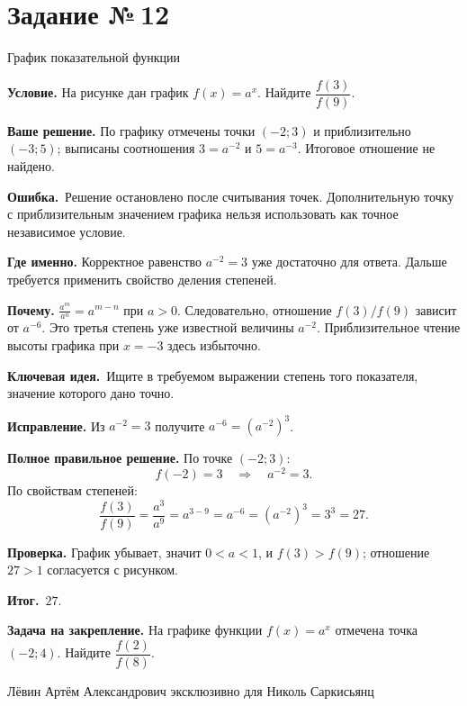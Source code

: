 \documentclass[a4paper,11pt]{article}
\newcommand{\Hdr}[1]{\par\vspace{2pt}\noindent\textbf{#1}\quad}
\newcommand{\E}{\par\smallskip\noindent\textcolor{errorred}{\textbf{Ошибка.}}\ }
\newcommand{\K}{\par\smallskip\noindent\textcolor{accent}{\textbf{Ключевая идея.}}\ }
\newcommand{\I}{\par\smallskip\noindent\textcolor{accent}{\textbf{Итог.}}\ }
\newcommand{\Task}[2]{\clearpage\phantomsection\label{task:#1}\section*{Задание №\,#1}\textcolor{accent}{#2}\par\vspace{7pt}}
\newcommand{\Footer}{\par\vfill\begin{center}\footnotesize\color{ink}Лёвин Артём Александрович эксклюзивно для Николь Саркисьянц\end{center}}
\begin{document}
\Task{12}{График показательной функции}
\Hdr{Условие.} На рисунке дан график $f(x)=a^x$. Найдите $\dfrac{f(3)}{f(9)}$.
\Hdr{Ваше решение.} По графику отмечены точки $(-2;3)$ и приблизительно $(-3;5)$; выписаны соотношения $3=a^{-2}$ и $5=a^{-3}$. Итоговое отношение не найдено.
\E Решение остановлено после считывания точек. Дополнительную точку с приблизительным значением графика нельзя использовать как точное независимое условие.
\Hdr{Где именно.} Корректное равенство $a^{-2}=3$ уже достаточно для ответа. Дальше требуется применить свойство деления степеней.
\Hdr{Почему.} $\frac{a^m}{a^n}=a^{m-n}$ при $a>0$. Следовательно, отношение $f(3)/f(9)$ зависит от $a^{-6}$. Это третья степень уже известной величины $a^{-2}$. Приблизительное чтение высоты графика при $x=-3$ здесь избыточно.
\K Ищите в требуемом выражении степень того показателя, значение которого дано точно.
\Hdr{Исправление.} Из $a^{-2}=3$ получите $a^{-6}=(a^{-2})^3$.
\Hdr{Полное правильное решение.} По точке $(-2;3)$:
\[f(-2)=3\quad\Longrightarrow\quad a^{-2}=3.\]
По свойствам степеней:
\[
\frac{f(3)}{f(9)}=\frac{a^3}{a^9}=a^{3-9}=a^{-6}
=(a^{-2})^3=3^3=\boxed{27}.
\]
\Hdr{Проверка.} График убывает, значит $0<a<1$, и $f(3)>f(9)$; отношение $27>1$ согласуется с рисунком.
\I $27$.
\Hdr{Задача на закрепление.} На графике функции $f(x)=a^x$ отмечена точка $(-2;4)$. Найдите $\dfrac{f(2)}{f(8)}$.
\Footer
\end{document}
